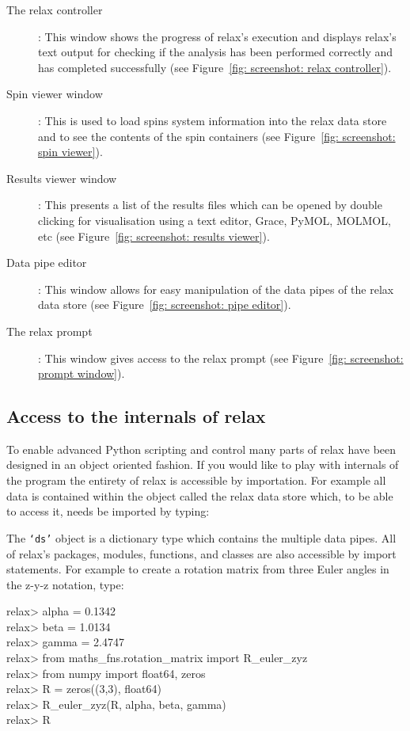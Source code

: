 \begin{description}
\item[The relax controller]:  This window shows the progress of relax's execution and displays relax's text output for checking if the analysis has been performed correctly and has completed successfully (see Figure~\ref{fig: screenshot: relax controller}).
\item[Spin viewer window]:  This is used to load spins system information into the relax data store and to see the contents of the spin containers (see Figure~\ref{fig: screenshot: spin viewer}).
\item[Results viewer window]:  This presents a list of the results files which can be opened by double clicking for visualisation using a text editor, Grace, PyMOL, MOLMOL, etc (see Figure~\ref{fig: screenshot: results viewer}).
\item[Data pipe editor]:  This window allows for easy manipulation of the data pipes of the relax data store (see Figure~\ref{fig: screenshot: pipe editor}).
\item[The relax prompt]:  This window gives access to the relax prompt (see Figure~\ref{fig: screenshot: prompt window}).
\end{description}




\subsection{Access to the internals of relax}

To enable advanced Python scripting and control many parts of relax have been designed in an object oriented fashion.  If you would like to play with internals of the program the entirety of relax is accessible by importation.  For example all data is contained within the object called the relax data store which, to be able to access it, needs be imported by typing:


The \texttt{`ds'} object is a dictionary type which contains the multiple data pipes.  All of relax's packages, modules, functions, and classes are also accessible by import statements.  For example to create a rotation matrix from three Euler angles in the z-y-z notation, type:

\begin{exampleenv}
relax> alpha = 0.1342 \\
relax> beta = 1.0134 \\
relax> gamma = 2.4747 \\
relax> from maths\_fns.rotation\_matrix import R\_euler\_zyz \\
relax> from numpy import float64, zeros \\
relax> R = zeros((3,3), float64) \\
relax> R\_euler\_zyz(R, alpha, beta, gamma) \\
relax> R
\end{exampleenv}



